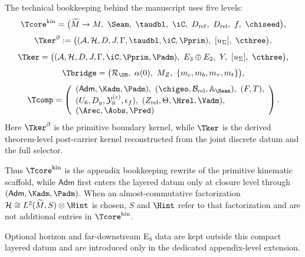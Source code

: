 \begin{construction}
The technical bookkeeping behind the manuscript uses five levels:
\[
\Tcore^{\mathrm{kin}}
=
\bigl(
\widetilde M\to M,\ \Seam,\ \taudbl,\ \iC,\ D_{\mathrm{ref}},\ D_{\mathrm{rel}},\ f,\ \chiseed
\bigr),
\]
\[
\Tker^\partial
:=
\bigl(
(\mathcal A,\mathcal H,D,J,\Gamma,\taudbl,\iC,\Pprim),\ [u_\Sigma],\ \cthree
\bigr),
\]
\[
\Tker
=
\bigl(
(\mathcal A,\mathcal H,D,J,\Gamma,\iC,\Pprim,\Padm),\ E_3\oplus E_2,\ Y,\ [u_\Sigma],\ \cthree
\bigr),
\]
\[
\Tbridge
=
\bigl(
\mathcal R_{\SM},\ \alpha(0),\ M_Z,\ \{m_c,m_b,m_\tau,m_t\}
\bigr),
\]
\[
\Tcomp
=
\left(
\begin{array}{l}
(\mathsf{Adm},\Kadm,\Padm),\ (\chigeo,\mathcal B_{\mathrm{rel}},\mathbb A_{\Seam}),\ (F,T),\\
(U_6,D_y,\mathcal Y_y^{(\varepsilon)},\epsilon_f),\ (Z_{\mathrm{rel}},\Theta,\Hrel,\Vadm),\\
(\Arec,\Aobs,\Pred)
\end{array}
\right).
\]
Here $\Tker^\partial$ is the primitive boundary kernel, while $\Tker$ is the derived theorem-level
post-carrier kernel reconstructed from the joint discrete datum and the full selector.
\end{construction}

Thus $\Tcore^{\mathrm{kin}}$ is the appendix bookkeeping rewrite of the primitive kinematic
scaffold, while $\mathsf{Adm}$ first enters the layered datum only at closure level through
$(\mathsf{Adm},\Kadm,\Padm)$. When an almost-commutative factorization
$\mathcal H\cong L^2(\widetilde M,S)\otimes\Hint$ is chosen, $S$ and $\Hint$ refer to that
factorization and are not additional entries in $\Tcore^{\mathrm{kin}}$.

Optional horizon and far-downstream E$_8$ data are kept outside this compact layered datum and are introduced only in the dedicated appendix-level extension.

